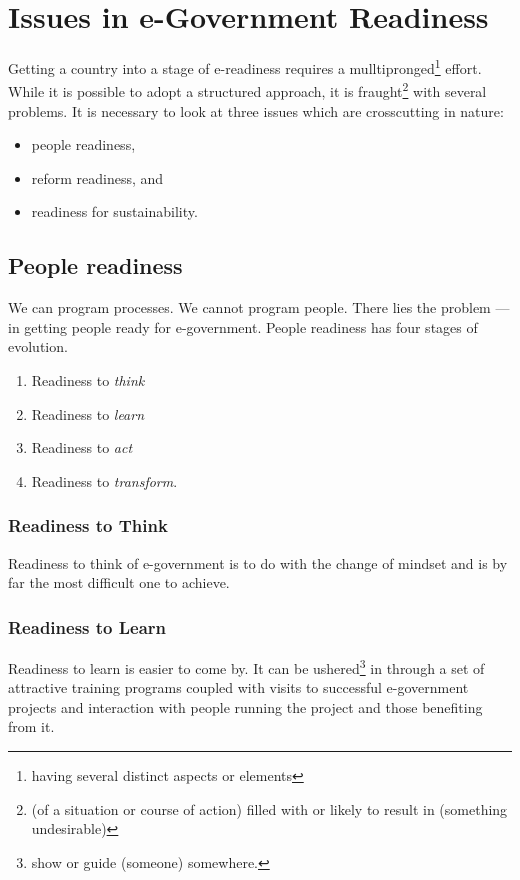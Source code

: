 \section{Issues in e-Government Readiness}
Getting a country into a stage of e-readiness requires a mulltipronged\footnote{having several distinct aspects or elements} effort. While it is possible to adopt a structured approach, it is fraught\footnote{(of a situation or course of action) filled with or likely to result in (something undesirable)} with several problems. It is necessary to look at three issues which are crosscutting in nature:
\begin{multicols}{2}
	\begin{itemize}
		\item people readiness,
		\item reform readiness, and 
		\item readiness for sustainability.
	\end{itemize}
\end{multicols}



\subsection{People readiness}
We can program processes. We cannot program people. There lies the problem — in getting people ready for e-government. People readiness has four stages of evolution.
\begin{multicols}{2}
	\begin{enumerate}
	\item Readiness to \textit{think}
	\item Readiness to \textit{learn}
	\item Readiness to \textit{act}
	\item Readiness to \textit{transform}.
\end{enumerate}
\end{multicols}


\subsubsection{Readiness to Think}
Readiness to think of e-government is to do with the change of mindset and is by far the most difficult one to achieve.

\subsubsection{Readiness to Learn}
Readiness to learn is easier to come by. It can be ushered\footnote{show or guide (someone) somewhere.} in through a set of attractive training programs coupled with visits to successful e-government projects and interaction with people running the project and those benefiting from it.

